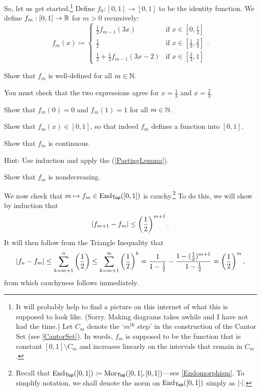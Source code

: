\begin{exm}
So, let us get started.\footnote{It will probably help to find a picture on this internet of what this is supposed to look like.  (Sorry.  Making diagrams takes awhile and I have not had the time.)  Let $C_m$ denote the `$m^{\text{th}}$ step' in the construction of the Cantor Set (see \cref{CantorSet}).  In words, $f_m$ is supposed to be the function that is constant $[0,1]\setminus C_m$ and increases linearly on the intervals that remain in $C_m$.}  Define $f_0:[0,1]\rightarrow [0,1]$ to be the identity function.  We define $f_m:[0,1]\rightarrow \mathbb{R}$ for $m>0$ recursively:
\begin{equation}\label{5.2.22}
f_m(x)\coloneqq \begin{cases}\tfrac{1}{2}f_{m-1}(3x) & \text{if }x\in [0,\tfrac{1}{3}] \\ \tfrac{1}{2} & \text{if }x\in [\tfrac{1}{3},\tfrac{2}{3}] \\ \tfrac{1}{2}+\tfrac{1}{2}f_{m-1}(3x-2) & \text{if }x\in [\tfrac{2}{3},1]\end{cases}.
\end{equation}
\begin{exr}
Show that $f_m$ is well-defined for all $m\in \mathbb{N}$.
\begin{rmk}
You must check that the two expressions agree for $x=\frac{1}{3}$ and $x=\frac{2}{3}$.
\end{rmk}
\end{exr}
\begin{exr}
Show that $f_m(0)=0$ and $f_m(1)=1$ for all $m\in \mathbb{N}$.
\end{exr}
\begin{exr}
Show that $f_m(x)\in [0,1]$, so that indeed $f_m$ defines a function into $[0,1]$.
\end{exr}
\begin{exr}
Show that $f_m$ is continuous.
\begin{rmk}
Hint:  Use induction and apply the  (\cref{PastingLemma}).
\end{rmk}
\end{exr}
\begin{exr}
Show that $f_m$ is nondecreasing.
\end{exr}

We now check that $m\mapsto f_m\in \operatorname{End} _{\mathsf{Top}}([0,1])$ is cauchy.\footnote{Recall that $\operatorname{End} _{\mathsf{Top}}([0,1])\coloneqq \operatorname{Mor} _{\mathsf{Top}}([0,1],[0,1])$---see \cref{Endomorphism}.  To simplify notation, we shall denote the norm on $\operatorname{End} _{\mathsf{Top}}([0,1])$ simply as $\norm$.} To do this, we will show by induction that
\begin{equation}\label{5.2.28}
\norm[f_{m+1}-f_m]\leq \left( \frac{1}{2}\right) ^{m+1}.
\end{equation}
It will then follow from the Triangle Inequality that
\begin{equation}
\norm[f_n-f_m]\leq \sum _{k=m+1}^n\left( \frac{1}{2}\right) \leq \sum _{k=m+1}^\infty \left( \frac{1}{2}\right) ^k=\frac{1}{1-\tfrac{1}{2}}-\frac{1-(\tfrac{1}{2})^{m+1}}{1-\tfrac{1}{2}}=\left( \frac{1}{2}\right) ^m,
\end{equation}
from which cauchyness follows immediately.


\end{exm}
